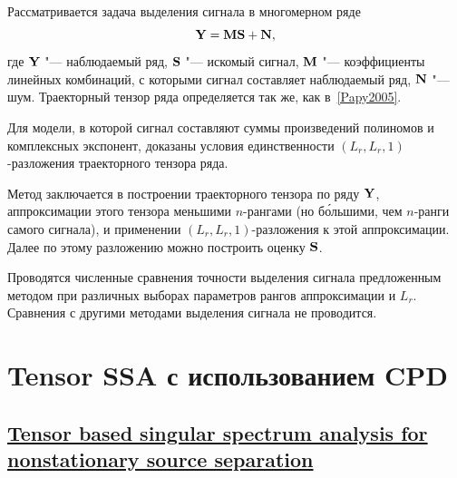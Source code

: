 \documentclass[12pt]{article}
\theoremstyle{plain}
\theoremstyle{definition}
\theoremstyle{remark}
\begin{document}
Рассматривается задача выделения сигнала в многомерном ряде
\[
  \mathbf{Y} = \mathbf{M} \mathbf{S} + \mathbf{N},
\]
где $\mathbf{Y}$ "--- наблюдаемый ряд, $\mathbf{S}$ "--- искомый сигнал, $\mathbf{M}$
"--- коэффициенты линейных комбинаций, с которыми сигнал составляет
наблюдаемый ряд, $\mathbf{N}$ "--- шум.
Траекторный тензор ряда определяется так же, как в~\ref{Papy2005}.

Для модели, в которой сигнал составляют суммы произведений полиномов
и комплексных экспонент, доказаны условия единственности $(L_r, L_r,
1)$-разложения траекторного тензора ряда.

Метод заключается в построении траекторного тензора по ряду $\mathbf{Y}$,
аппроксимации этого тензора меньшими $n$-рангами (но б\'{о}льшими, чем
$n$-ранги самого сигнала), и применении $(L_r, L_r, 1)$-разложения к
этой аппроксимации.
Далее по этому разложению можно построить оценку $\mathbf{S}$.

Проводятся численные сравнения точности выделения сигнала
предложенным методом при различных выборах параметров рангов
аппроксимации и $L_r$.
Сравнения с другими методами выделения сигнала не проводится.

\section{Tensor SSA с использованием CPD}
\subsection{\href{https://doi.org/10.1109/MLSP.2013.6661921}{Tensor based
singular spectrum analysis for nonstationary source separation}}
\end{document}
